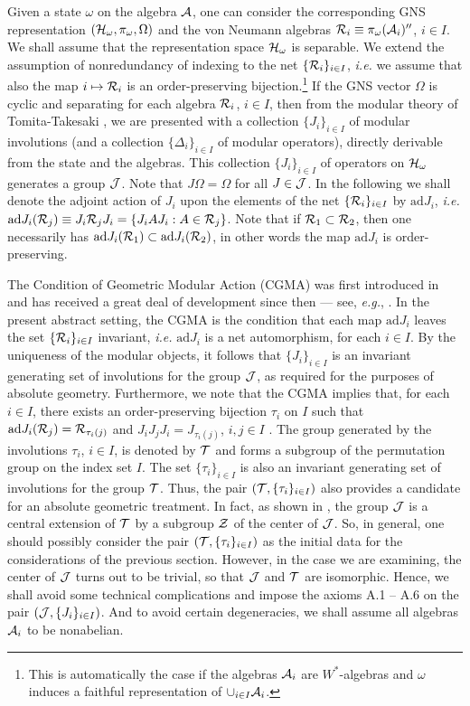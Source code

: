 \documentclass[a4paper,twoside,12pt]{article}
\def\irnet{{\{\Rs_i \}_{i \in I}}}
\def\As{{\cal A}}
\def\Hs{{\cal H}}
\def\Js{{\cal J}}
\def\Rs{{\cal R}}
\def\Ts{{\cal T}}
\def\Zs{{\cal Z}}
\def\ad{{\mathrm{ad}}}
\begin{document}
     Given a state $\omega$ on the algebra $\As$, one can consider the 
corresponding GNS representation $(\Hs_{\omega},\pi_{\omega},\Omega)$ and the 
von Neumann algebras $\Rs_i \equiv \pi_{\omega}(\As_i)''$, $i \in I$. We
shall assume that the representation space $\Hs_{\omega}$ is separable. We 
extend the assumption of nonredundancy of indexing to the net 
$\{ \Rs_i \}_{i \in I}$, {\it i.e.} we assume that also the map 
$i \mapsto \Rs_i$ is an order-preserving bijection.\footnote{This is 
automatically the case if the algebras $\As_i$ are $W^*$-algebras and
$\omega$ induces a faithful representation of 
$\cup_{i \in I} \As_i$.} If the GNS vector $\Omega$ is cyclic and 
separating for each algebra $\Rs_i$, $i \in I$, then from the modular theory 
of Tomita-Takesaki \cite{Tak,BR}, we are presented with a collection 
$\{J_i\}_{i\in I}$ of modular involutions 
(and a collection $\{\Delta_i\}_{i\in I}$ of modular 
operators), directly derivable from the state and the algebras. This 
collection $\{J_i\}_{i\in I}$ of operators on $\Hs_{\omega}$ generates a group 
$\Js$. Note that $J\Omega = \Omega$ for all $J \in \Js$. 
In the following we shall denote the adjoint action of $J_i$ upon the 
elements of the net $\irnet$ by $\ad J_i$, {\it i.e.} 
$\ad J_i (\Rs_j) \equiv J_i \Rs_j J_i = \{ J_i A J_i : A \in \Rs_j \}$. 
Note that if $\Rs_1 \subset \Rs_2$, then one necessarily has 
$\ad J_i (\Rs_1) \subset \ad J_i (\Rs_2)$, in other words the map $\ad J_i$ is
order-preserving. 

     The Condition of Geometric Modular Action (CGMA) was first
introduced in \cite{BS} and has received a great deal of development
since then --- see, {\it e.g.}, \cite{Bor0,BDFS,BFS1,BMS,Bor}. In the
present abstract setting, the CGMA is the condition that each map 
$\ad J_i$ leaves the set $\{ \Rs_i \}_{i \in I}$ invariant, 
{\it i.e.} $\ad J_i$ is a net
automorphism, for each $i \in I$. By the uniqueness of the modular
objects, it follows that $\{ J_i \}_{i \in I}$ is an invariant
generating set of involutions for the group $\Js$, as required for the
purposes of absolute geometry. Furthermore, we note that the CGMA implies 
that, for each $i \in I$, there exists an order-preserving bijection 
$\tau_i$ on $I$ such that $\ad J_i(\Rs_j) = \Rs_{\tau_i(j)}$ and 
$J_i J_j J_i = J_{\tau_i(j)}$, $i,j \in I$ \cite{BDFS}. The group generated 
by the involutions $\tau_i$, $i \in I$, is denoted by $\Ts$ and forms a
subgroup of the permutation group on the index set $I$. The set 
$\{ \tau_i \}_{i \in I}$ is also an invariant generating set of involutions
for the group $\Ts$. Thus, the pair $(\Ts,\{ \tau_i \}_{i \in I})$ also 
provides a candidate for an absolute geometric treatment. In fact, as 
shown in \cite{BDFS}, the group $\Js$ is a central extension of $\Ts$ by a 
subgroup $\Zs$ of the center of $\Js$. So, in general, one should possibly
consider the pair $(\Ts,\{ \tau_i \}_{i \in I})$ as the initial data
for the considerations of the previous section. However, in the case
we are examining, the center of $\Js$ turns out to be trivial, so that
$\Js$ and $\Ts$ are isomorphic. Hence, we shall avoid some technical
complications and impose the axioms A.1 -- A.6 on the pair
$(\Js, \{ J_i \}_{i \in I})$. And to avoid certain degeneracies, we
shall assume all algebras $\As_i$ to be nonabelian.
\end{document}
